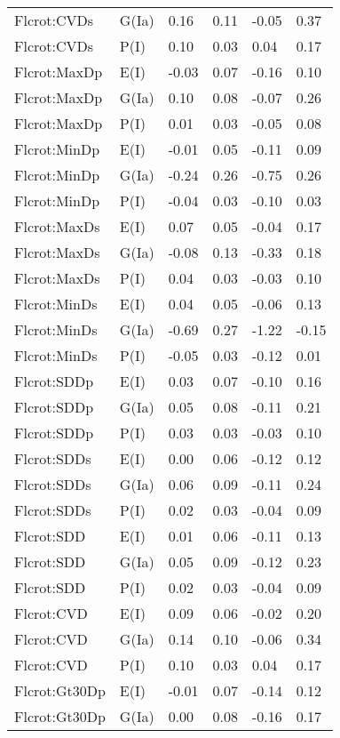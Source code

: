 \begin{center}
\begin{longtable}{|p{1.1in}|p{0.7in}|p{0.7in}|p{0.6in}|p{0.6in}|p{0.6in}|}
  Flcrot:CVDs & G(Ia) & 0.16 & 0.11 & -0.05 & 0.37 \\ 
  Flcrot:CVDs & P(I) & 0.10 & 0.03 & 0.04 & 0.17 \\ 
  Flcrot:MaxDp & E(I) & -0.03 & 0.07 & -0.16 & 0.10 \\ 
  Flcrot:MaxDp & G(Ia) & 0.10 & 0.08 & -0.07 & 0.26 \\ 
  Flcrot:MaxDp & P(I) & 0.01 & 0.03 & -0.05 & 0.08 \\ 
  Flcrot:MinDp & E(I) & -0.01 & 0.05 & -0.11 & 0.09 \\ 
  Flcrot:MinDp & G(Ia) & -0.24 & 0.26 & -0.75 & 0.26 \\ 
  Flcrot:MinDp & P(I) & -0.04 & 0.03 & -0.10 & 0.03 \\ 
  Flcrot:MaxDs & E(I) & 0.07 & 0.05 & -0.04 & 0.17 \\ 
  Flcrot:MaxDs & G(Ia) & -0.08 & 0.13 & -0.33 & 0.18 \\ 
  Flcrot:MaxDs & P(I) & 0.04 & 0.03 & -0.03 & 0.10 \\ 
  Flcrot:MinDs & E(I) & 0.04 & 0.05 & -0.06 & 0.13 \\ 
  Flcrot:MinDs & G(Ia) & -0.69 & 0.27 & -1.22 & -0.15 \\ 
  Flcrot:MinDs & P(I) & -0.05 & 0.03 & -0.12 & 0.01 \\ 
  Flcrot:SDDp & E(I) & 0.03 & 0.07 & -0.10 & 0.16 \\ 
  Flcrot:SDDp & G(Ia) & 0.05 & 0.08 & -0.11 & 0.21 \\ 
  Flcrot:SDDp & P(I) & 0.03 & 0.03 & -0.03 & 0.10 \\ 
  Flcrot:SDDs & E(I) & 0.00 & 0.06 & -0.12 & 0.12 \\ 
  Flcrot:SDDs & G(Ia) & 0.06 & 0.09 & -0.11 & 0.24 \\ 
  Flcrot:SDDs & P(I) & 0.02 & 0.03 & -0.04 & 0.09 \\ 
  Flcrot:SDD & E(I) & 0.01 & 0.06 & -0.11 & 0.13 \\ 
  Flcrot:SDD & G(Ia) & 0.05 & 0.09 & -0.12 & 0.23 \\ 
  Flcrot:SDD & P(I) & 0.02 & 0.03 & -0.04 & 0.09 \\ 
  Flcrot:CVD & E(I) & 0.09 & 0.06 & -0.02 & 0.20 \\ 
  Flcrot:CVD & G(Ia) & 0.14 & 0.10 & -0.06 & 0.34 \\ 
  Flcrot:CVD & P(I) & 0.10 & 0.03 & 0.04 & 0.17 \\ 
  Flcrot:Gt30Dp & E(I) & -0.01 & 0.07 & -0.14 & 0.12 \\ 
  Flcrot:Gt30Dp & G(Ia) & 0.00 & 0.08 & -0.16 & 0.17 \\ 

\end{longtable}
\end{center}
